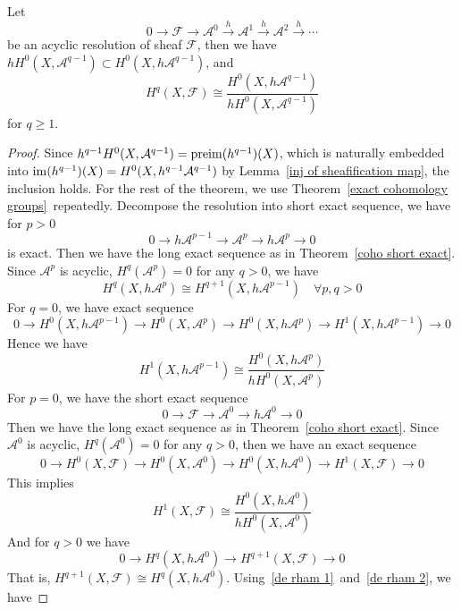 \begin{thm}\label{acyclic de rham}
    Let
    \[0\to\mathcal{F}\to\mathcal{A}^0\xrightarrow{h}\mathcal{A}^1\xrightarrow{h}\mathcal{A}^2\xrightarrow{h}\cdots\]
    be an acyclic resolution of sheaf $\mathcal{F}$, then we have $hH^0(X,\mathcal{A}^{q-1})\subset H^0(X,h\mathcal{A}^{q-1})$, and
    \[H^q(X,\mathcal{F})\cong\frac{H^0(X,h\mathcal{A}^{q-1})}{hH^0(X,\mathcal{A}^{q-1})}\]
    for $q\geq 1$.
\end{thm}
\begin{proof}
    Since $h^{q-1}H^0(X,\mathcal{A}^{q-1})=\operatorname{preim}(h^{q-1})(X)$, which is naturally embedded into $\operatorname{im}(h^{q-1})(X)=H^0(X,h^{q-1}\mathcal{A}^{q-1})$ by Lemma~\ref{inj of sheafification map}, the inclusion holds.
    For the rest of the theorem, we use Theorem~\ref{exact cohomology groups}~repeatedly.
    Decompose the resolution into short exact sequence, we have for $p>0$
    \[0\to h\mathcal{A}^{p-1}\to\mathcal{A}^p\to h\mathcal{A}^p\to 0\]
    is exact.
    Then we have the long exact sequence as in Theorem~\ref{coho short exact}.
    Since $\mathcal{A}^p$ is acyclic, $H^q(\mathcal{A}^p)=0$ for any $q>0$, we have
    \begin{equation}
        H^q(X,h\mathcal{A}^p)\cong H^{q+1}(X,h\mathcal{A}^{p-1})\quad \forall p,q>0\label{de rham 1}
    \end{equation}
    For $q=0$, we have exact sequence
    \[0\to H^0(X,h\mathcal{A}^{p-1})\to H^0(X,\mathcal{A}^p)\to H^0(X,h\mathcal{A}^p)\to H^1(X,h\mathcal{A}^{p-1})\to 0\]
    Hence we have
    \begin{equation}
        H^1(X,h\mathcal{A}^{p-1})\cong\frac{H^0(X,h\mathcal{A}^p)}{hH^0(X,\mathcal{A}^p)}\label{de rham 2}
    \end{equation}
    For $p=0$, we have the short exact sequence
    \[0\to\mathcal{F}\to\mathcal{A}^0\to h\mathcal{A}^0\to 0\]
    Then we have the long exact sequence as in Theorem~\ref{coho short exact}.
    Since $\mathcal{A}^0$ is acyclic, $H^q(\mathcal{A}^0)=0$ for any $q>0$, then we have an exact sequence
    \[0\to H^0(X,\mathcal{F})\to H^0(X,\mathcal{A}^0)\to H^0(X,h\mathcal{A}^0)\to H^1(X,\mathcal{F})\to 0\]
    This implies
    \begin{equation}
        H^1(X,\mathcal{F})\cong\frac{H^0(X,h\mathcal{A}^0)}{hH^0(X,\mathcal{A}^0)}\label{de rham 3}
    \end{equation}
    And for $q>0$ we have
    \[0\to H^q(X,h\mathcal{A}^0)\to H^{q+1}(X,\mathcal{F})\to 0\]
    That is, $H^{q+1}(X,\mathcal{F})\cong H^q(X,h\mathcal{A}^0)$.
    Using~\eqref{de rham 1}~and~\eqref{de rham 2}, we have

\end{proof}
